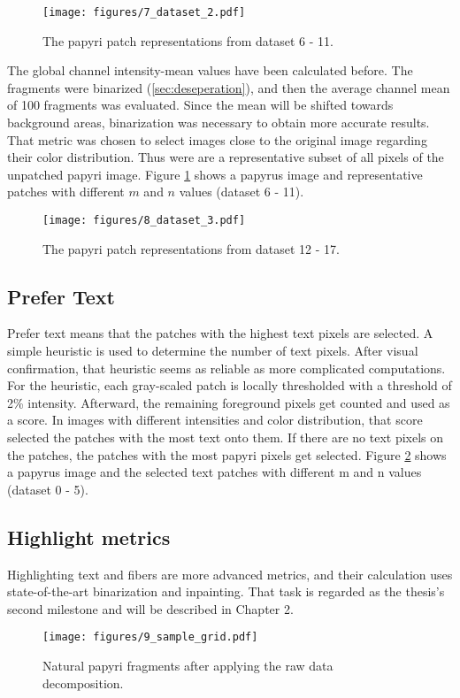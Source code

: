 \begin{figure}[t]	
	\texttt{[image: figures/7\_dataset\_2.pdf]}
	\caption{The papyri patch representations from dataset 6 - 11.}
	\label{fig:dataset2}
\end{figure}

The global channel intensity-mean values have been calculated before. The fragments were binarized (\ref{sec:deseperation}), and then the average channel mean of 100 fragments was evaluated. Since the mean will be shifted towards background areas, binarization was necessary to obtain more accurate results. That metric was chosen to select images close to the original image regarding their color distribution. Thus were are a representative subset of all pixels of the unpatched papyri image. Figure \ref{fig:dataset2} shows a papyrus image and representative patches with different \(m\) and \(n\) values (dataset 6 - 11).


\begin{figure}[t]
	\texttt{[image: figures/8\_dataset\_3.pdf]}
	\caption{The papyri patch representations from dataset 12 - 17.}
	\label{fig:dataset3}
\end{figure}

\subsection{Prefer Text}
Prefer text means that the patches with the highest text pixels are selected. A simple heuristic is used to determine the number of text pixels. After visual confirmation, that heuristic seems as reliable as more complicated computations. For the heuristic, each gray-scaled patch is locally thresholded with a threshold of 2\% intensity. Afterward, the remaining foreground pixels get counted and used as a score. In images with different intensities and color distribution, that score selected the patches with the most text onto them. If there are no text pixels on the patches, the patches with the most papyri pixels get selected. Figure \ref{fig:dataset3} shows a papyrus image and the selected text patches with different m and n values (dataset 0 - 5).


\subsection{Highlight metrics}
Highlighting text and fibers are more advanced metrics, and their calculation uses state-of-the-art binarization and inpainting. That task is regarded as the thesis's second milestone and will be described in Chapter 2. 

\begin{figure}[t]
	\texttt{[image: figures/9\_sample\_grid.pdf]}
	\caption{Natural papyri fragments after applying the raw data decomposition.}
	\label{fig:sample_grid}
\end{figure}





